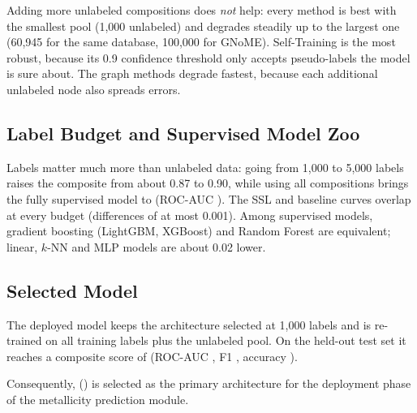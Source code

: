
Adding more unlabeled compositions does \emph{not} help: every method is best with the
smallest pool (1,000 unlabeled) and degrades steadily up to the largest one (60,945
for the same database, 100,000 for GNoME). Self-Training is the most
robust, because its 0.9 confidence threshold only accepts pseudo-labels the model is sure
about. The graph methods degrade fastest, because each additional unlabeled node also spreads
errors.

\subsection*{Label Budget and Supervised Model Zoo}



Labels matter much more than unlabeled data: going from 1,000 to 5,000 labels raises the
composite from about 0.87 to 0.90, while using all \MetalN{} compositions brings the fully
supervised model to \MetalInFullComp{} (ROC-AUC \MetalInFullAUC{}). The SSL and baseline curves
overlap at every budget (differences of at most 0.001). Among supervised
models, gradient boosting (LightGBM, XGBoost) and Random Forest are equivalent; linear, $k$-NN
and MLP models are about 0.02 lower.

\subsection*{Selected Model}

The deployed model keeps the architecture selected at 1,000 labels and is re-trained on all
training labels plus the unlabeled pool. On the held-out test set it reaches a composite score
of \MetalSelComp{} (ROC-AUC \MetalSelAUC{}, F1 \MetalSelFone{}, accuracy \MetalSelAcc{}).

Consequently, \textbf{\MetalSelMethod{}} (\texttt{\MetalSelConfig}) is selected as the primary
architecture for the deployment phase of the metallicity prediction module.
